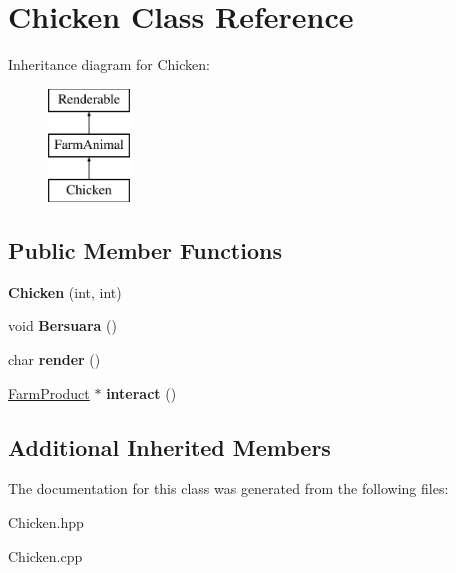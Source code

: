 \hypertarget{class_chicken}{}\section{Chicken Class Reference}
\label{class_chicken}
Inheritance diagram for Chicken\+:\begin{figure}[H]
\begin{center}
\leavevmode
\includegraphics[height=3.000000cm]{class_chicken}
\end{center}
\end{figure}
\subsection*{Public Member Functions}
\begin{DoxyCompactItemize}
\item 
\mbox{\label{class_chicken_ac4459e456baa4dc168f3162d48108c31}} 
{\bfseries Chicken} (int, int)
\item 
\mbox{\label{class_chicken_a48dfbe2a097d1f4b6b27d1ba6a9e1b77}} 
void {\bfseries Bersuara} ()
\item 
\mbox{\label{class_chicken_a0f3537589ee4822186aad3c8cf105db3}} 
char {\bfseries render} ()
\item 
\mbox{\label{class_chicken_aa4f31a6e870007880b634a3f49292fa2}} 
\mbox{\hyperlink{class_farm_product}{Farm\+Product}} $\ast$ {\bfseries interact} ()
\end{DoxyCompactItemize}
\subsection*{Additional Inherited Members}


The documentation for this class was generated from the following files\+:\begin{DoxyCompactItemize}
\item 
Chicken.\+hpp\item 
Chicken.\+cpp\end{DoxyCompactItemize}
